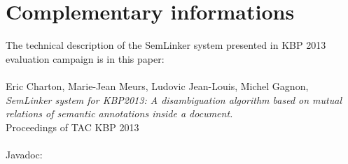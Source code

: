 \documentclass[11pt]{article}
\newcommand{\seml}{SemLinker}
\begin{document}
\section{Complementary informations}
\label{sec:compinfo}
The technical description of the \seml{} system presented in KBP 2013 evaluation campaign is in this paper:\\
\\
Eric Charton, Marie-Jean Meurs, Ludovic Jean-Louis, Michel Gagnon,\\
\textit{SemLinker system for KBP2013: A disambiguation algorithm based on mutual relations of semantic annotations inside a document.}\\
Proceedings of TAC KBP 2013\\
\\
Javadoc:




% 
% 
\end{document}
